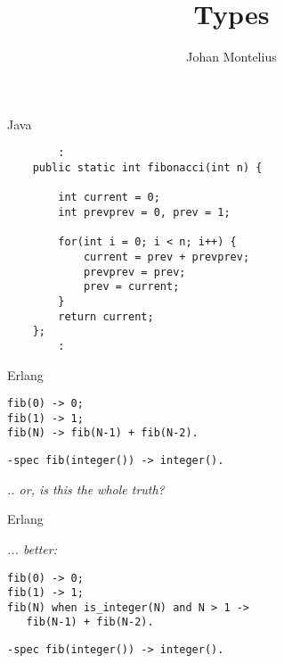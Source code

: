 

\title[ID1019 Types]{Types}


\author{Johan Montelius}
\date{\semester}



\begin{frame}
\titlepage
\end{frame}

\begin{frame}[fragile]{Java}

\pause 
\begin{verbatim}
        :
    public static int fibonacci(int n) {

        int current = 0;
        int prevprev = 0, prev = 1;

        for(int i = 0; i < n; i++) { 
            current = prev + prevprev;  
            prevprev = prev;
            prev = current; 
        }
        return current;
    };
        :
\end{verbatim}

\end{frame} 

\begin{frame}[fragile]{Erlang}

\begin{verbatim}
fib(0) -> 0;
fib(1) -> 1;
fib(N) -> fib(N-1) + fib(N-2).
\end{verbatim}
\pause\vspace{10pt}
\begin{verbatim}
-spec fib(integer()) -> integer().
\end{verbatim}
\pause\vspace{10pt}
{\em .. or, is this the whole truth?}
\end{frame}

\begin{frame}[fragile]{Erlang}

{\em ... better:}
\vspace{20pt}

\begin{verbatim}
fib(0) -> 0;
fib(1) -> 1;
fib(N) when is_integer(N) and N > 1 -> 
   fib(N-1) + fib(N-2).
\end{verbatim}
\pause\vspace{10pt}
\begin{verbatim}
-spec fib(integer()) -> integer().
\end{verbatim}


\end{frame}

